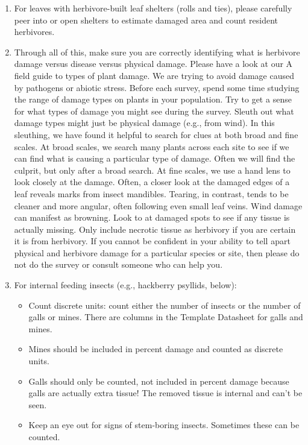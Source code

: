 \documentclass[
  letterpaper,
  oneside,
  open=any]{scrbook}
\begin{document}
\begin{enumerate}
\def\labelenumi{\arabic{enumi}.}
\setcounter{enumi}{9}
\item
  For leaves with herbivore-built leaf shelters (rolls and ties), please
  carefully peer into or open shelters to estimate damaged area and
  count resident herbivores.
\item
  Through all of this, make sure you are correctly identifying what is
  herbivore damage versus disease versus physical damage. Please have a
  look at our A field guide to types of plant damage. We are trying to
  avoid damage caused by pathogens or abiotic stress. Before each
  survey, spend some time studying the range of damage types on plants
  in your population. Try to get a sense for what types of damage you
  might see during the survey. Sleuth out what damage types might just
  be physical damage (e.g., from wind). In this sleuthing, we have found
  it helpful to search for clues at both broad and fine scales. At broad
  scales, we search many plants across each site to see if we can find
  what is causing a particular type of damage. Often we will find the
  culprit, but only after a broad search. At fine scales, we use a hand
  lens to look closely at the damage. Often, a closer look at the
  damaged edges of a leaf reveals marks from insect mandibles. Tearing,
  in contrast, tends to be cleaner and more angular, often following
  even small leaf veins. Wind damage can manifest as browning. Look to
  at damaged spots to see if any tissue is actually missing. Only
  include necrotic tissue as herbivory if you are certain it is from
  herbivory. If you cannot be confident in your ability to tell apart
  physical and herbivore damage for a particular species or site, then
  please do not do the survey or consult someone who can help you.
\item
  For internal feeding insects (e.g., hackberry psyllids, below):

  \begin{itemize}
  \item
    Count discrete units: count either the number of insects or the
    number of galls or mines. There are columns in the Template
    Datasheet for galls and mines.
  \item
    Mines should be included in percent damage and counted as discrete
    units.
  \item
    Galls should only be counted, not included in percent damage because
    galls are actually extra tissue! The removed tissue is internal and
    can't be seen.
  \item
    Keep an eye out for signs of stem-boring insects. Sometimes these
    can be counted.
  \end{itemize}
\end{enumerate}
\end{document}
